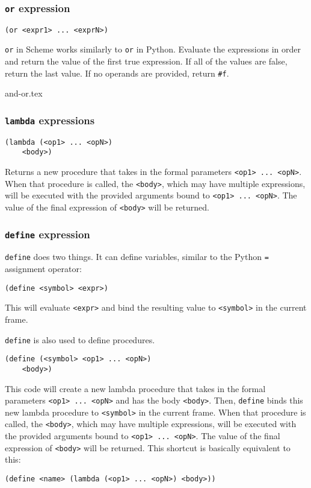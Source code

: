 \subsubsection{\lstinline{or} expression}
\begin{lstlisting}
(or <expr1> ... <exprN>)
\end{lstlisting}
\lstinline{or} in Scheme works similarly to \lstinline{or} in Python. Evaluate the expressions in order and return the value of the first true expression. If all of the values are false, return the last value. If no operands are provided, return \lstinline{#f}.

{and-or.tex}

\subsubsection{\lstinline{lambda} expressions}
\begin{lstlisting}
(lambda (<op1> ... <opN>) 
    <body>) 
\end{lstlisting}
Returns a new procedure that takes in the formal parameters \lstinline{<op1> ... <opN>}. When that procedure is called, the \lstinline{<body>}, which may have multiple expressions, will be executed with the provided arguments bound to \lstinline{<op1> ... <opN>}. The value of the final expression of \lstinline{<body>} will be returned. 

\subsubsection{\lstinline{define} expression}

\lstinline{define} does two things. It can define variables, similar to the Python \lstinline{=} assignment operator:
\begin{lstlisting}
(define <symbol> <expr>)
\end{lstlisting}
This will evaluate \lstinline{<expr>} and bind the resulting value to \lstinline{<symbol>} in the current frame. 

\lstinline{define} is also used to define procedures. 

\begin{lstlisting}
(define (<symbol> <op1> ... <opN>) 
    <body>)
\end{lstlisting} 
This code will create a new lambda procedure that takes in the formal parameters \lstinline{<op1> ... <opN>} and has the body \lstinline{<body>}. Then, \lstinline{define} binds this new lambda procedure to \lstinline{<symbol>} in the current frame. When that procedure is called, the \lstinline{<body>}, which may have multiple expressions, will be executed with the provided arguments bound to \lstinline{<op1> ... <opN>}. The value of the final expression of \lstinline{<body>} will be returned. This shortcut is basically equivalent to this:
\begin{lstlisting}
(define <name> (lambda (<op1> ... <opN>) <body>)) 
\end{lstlisting}

